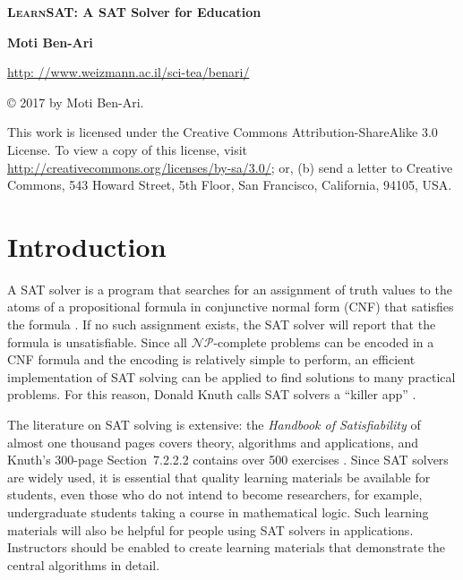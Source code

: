 \documentclass[11pt]{article}
\newcommand*{\ls}{\textsc{LearnSAT}}
\begin{document}
\thispagestyle{empty}

\begin{center}

\textbf{\LARGE \ls{}: A SAT Solver for Education}

\bigskip

\textbf{\Large Moti Ben-Ari}

\bigskip

\large\url{http: //www.weizmann.ac.il/sci-tea/benari/}

\end{center}

\begin{center}
\copyright{} 2017 by Moti Ben-Ari.
\end{center}
{\footnotesize This work is licensed under the Creative Commons Attribution-ShareAlike 3.0
License. To view a copy of this license, visit
\url{http://creativecommons.org/licenses/by-sa/3.0/}; or, (b) send a letter
to Creative Commons, 543 Howard Street, 5th Floor, San Francisco,
California, 94105, USA.}


\section{Introduction}

A SAT solver is a program that searches for an assignment of truth values to the atoms of a propositional formula in conjunctive normal form (CNF) that satisfies the formula \cite[Chapter~6]{mlcs}. If no such assignment exists, the SAT solver will report that the formula is unsatisfiable. Since all $\mathcal{NP}$-complete problems can be encoded in a CNF formula and the encoding is relatively simple to perform, an efficient implementation of SAT solving can be applied to find solutions to many practical problems. For this reason, Donald Knuth calls SAT solvers a ``killer app'' \cite{knuth-sat}. 

The literature on SAT solving is extensive: the \emph{Handbook of Satisfiability} \cite{SAT} of almost one thousand pages covers theory, algorithms and applications, and Knuth's 300-page Section~7.2.2.2 contains over 500 exercises \cite{knuth-sat}. Since SAT solvers are widely used, it is essential that quality learning materials be available for students, even those who do not intend to become researchers, for example, undergraduate students taking a course in mathematical logic. Such learning materials will also be helpful for people using SAT solvers in applications. Instructors should be enabled to create learning materials that demonstrate the central algorithms in detail.
\end{document}
